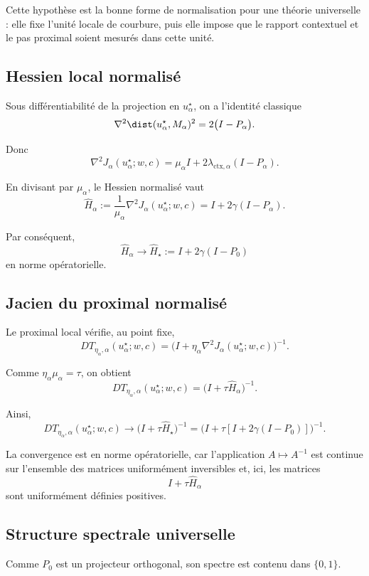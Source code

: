 Cette hypothèse est la bonne forme de normalisation pour une théorie universelle : elle fixe l'unité locale de courbure, puis elle impose que le rapport contextuel et le pas proximal soient mesurés dans cette unité.

\subsection{Hessien local normalisé}

Sous différentiabilité de la projection en \(u_\alpha^\star\), on a l'identité classique
\[
\nabla^2 \dist(u_\alpha^\star,M_\alpha)^2
=
2\bigl(I-P_\alpha\bigr).
\]

Donc
\[
\nabla^2 J_\alpha(u_\alpha^\star;w,c)
=
\mu_\alpha I
+
2\lambda_{\mathrm{ctx},\alpha}(I-P_\alpha).
\]

En divisant par \(\mu_\alpha\), le Hessien normalisé vaut
\[
\widehat H_\alpha
:=
\frac{1}{\mu_\alpha}\nabla^2 J_\alpha(u_\alpha^\star;w,c)
=
I + 2\gamma (I-P_\alpha).
\]

Par conséquent,
\[
\widehat H_\alpha \to \widehat H_\star
:=
I + 2\gamma(I-P_0)
\]
en norme opératorielle.

\subsection{Jacien du proximal normalisé}

Le proximal local vérifie, au point fixe,
\[
DT_{\eta_\alpha,\alpha}(u_\alpha^\star;w,c)
=
\bigl(I+\eta_\alpha \nabla^2 J_\alpha(u_\alpha^\star;w,c)\bigr)^{-1}.
\]

Comme \(\eta_\alpha\mu_\alpha=\tau\), on obtient
\[
DT_{\eta_\alpha,\alpha}(u_\alpha^\star;w,c)
=
\bigl(I+\tau \widehat H_\alpha\bigr)^{-1}.
\]

Ainsi,
\[
DT_{\eta_\alpha,\alpha}(u_\alpha^\star;w,c)
\to
\bigl(I+\tau \widehat H_\star\bigr)^{-1}
=
\bigl(I+\tau[I+2\gamma(I-P_0)]\bigr)^{-1}.
\]

La convergence est en norme opératorielle, car l'application \(A\mapsto A^{-1}\) est continue sur l'ensemble des matrices uniformément inversibles et, ici, les matrices
\[
I+\tau \widehat H_\alpha
\]
sont uniformément définies positives.

\subsection{Structure spectrale universelle}

Comme \(P_0\) est un projecteur orthogonal, son spectre est contenu dans \(\{0,1\}\).

